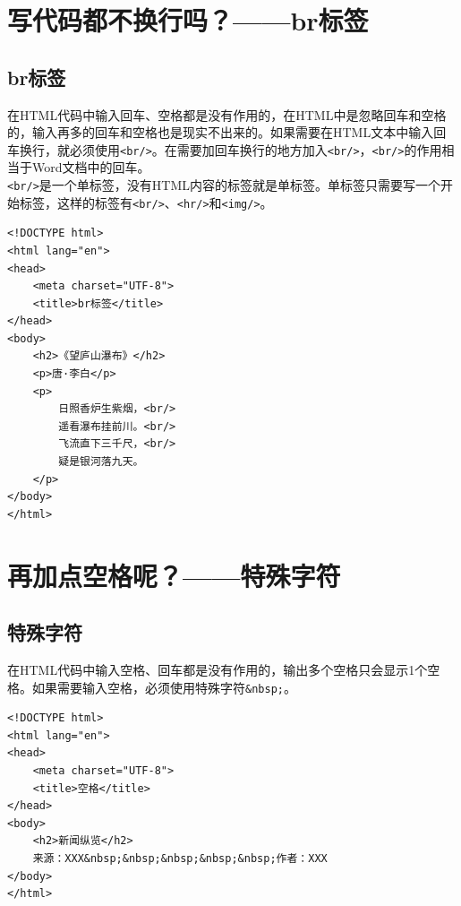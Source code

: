 \newpage

\section{写代码都不换行吗？——br标签}

\subsection{br标签}

在HTML代码中输入回车、空格都是没有作用的，在HTML中是忽略回车和空格的，输入再多的回车和空格也是现实不出来的。如果需要在HTML文本中输入回车换行，就必须使用\lstinline|<br/>|。在需要加回车换行的地方加入\lstinline|<br/>|，\lstinline|<br/>|的作用相当于Word文档中的回车。 \\

\lstinline|<br/>|是一个单标签，没有HTML内容的标签就是单标签。单标签只需要写一个开始标签，这样的标签有\lstinline|<br/>|、\lstinline|<hr/>|和\lstinline|<img/>|。

\begin{lstlisting}[style=htmlcssjs, title=br标签]
<!DOCTYPE html>
<html lang="en">
<head>
    <meta charset="UTF-8">
    <title>br标签</title>
</head>
<body>
    <h2>《望庐山瀑布》</h2>
    <p>唐·李白</p>
    <p>
        日照香炉生紫烟，<br/>
        遥看瀑布挂前川。<br/>
        飞流直下三千尺，<br/>
        疑是银河落九天。
    </p>
</body>
</html>
\end{lstlisting}

\newpage

\section{再加点空格呢？——特殊字符}

\subsection{特殊字符}

在HTML代码中输入空格、回车都是没有作用的，输出多个空格只会显示1个空格。如果需要输入空格，必须使用特殊字符\lstinline|&nbsp;|。

\begin{lstlisting}[style=htmlcssjs, title=特殊字符]
<!DOCTYPE html>
<html lang="en">
<head>
    <meta charset="UTF-8">
    <title>空格</title>
</head>
<body>
    <h2>新闻纵览</h2>
    来源：XXX&nbsp;&nbsp;&nbsp;&nbsp;&nbsp;作者：XXX
</body>
</html>
\end{lstlisting}

